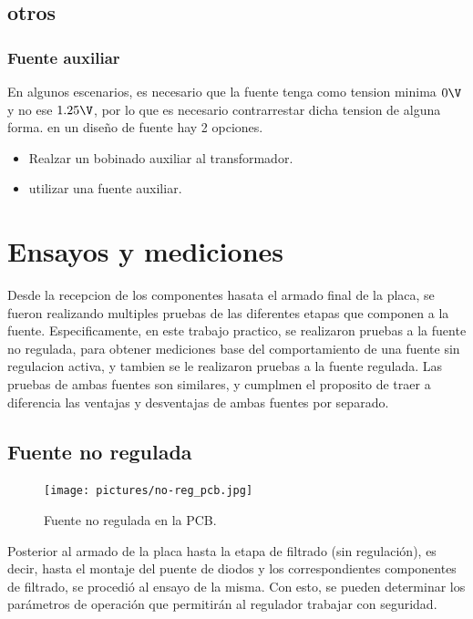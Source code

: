 \documentclass[chaptersright]{informeutn}
\begin{document}
      \section{otros}
        \subsection{Fuente auxiliar}
          En algunos escenarios, es necesario que la fuente tenga como tension minima $0\V$ y no ese $1.25\V$, por lo
          que es necesario contrarrestar dicha tension de alguna forma. en un diseño de fuente hay 2 opciones.
          \begin{itemize}
            \item Realzar un bobinado auxiliar al transformador.
            \item utilizar una fuente auxiliar.
          \end{itemize}
        

  \chapter{Ensayos y mediciones}
    Desde la recepcion de los componentes hasata el armado final de la placa, se fueron realizando multiples pruebas
    de las diferentes etapas que componen a la fuente. Especificamente, en este trabajo practico, se realizaron pruebas
    a la fuente no regulada, para obtener mediciones base del comportamiento de una fuente sin regulacion activa, y
    tambien se le realizaron pruebas a la fuente regulada. Las pruebas de ambas fuentes son similares, y cumplmen el
    proposito de traer a diferencia las ventajas y desventajas de ambas fuentes por separado.

    \section{Fuente no regulada}
      \begin{figure}
        \centering
        \texttt{[image: pictures/no-reg\_pcb.jpg]}
        \caption{Fuente no regulada en la PCB.}
      \end{figure}
      Posterior al armado de la placa hasta la etapa de filtrado (sin regulación), es decir, hasta el montaje del
      puente de diodos y los correspondientes componentes de filtrado, se procedió al ensayo de la misma. Con esto,
      se pueden determinar los parámetros de operación que permitirán al regulador trabajar con seguridad.
\end{document}
